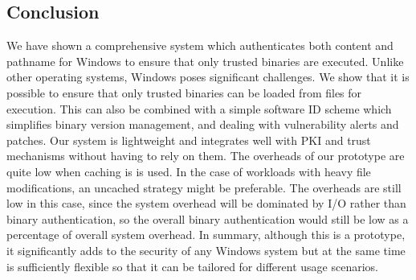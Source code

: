\subsection{Conclusion}
\label{sect:conclusion}

We have shown a comprehensive system which authenticates both content and pathname
for Windows to ensure that only trusted binaries are executed. 
Unlike other operating systems, Windows poses significant challenges.
We show that it is possible to ensure that only trusted binaries can be loaded
from files for execution. 
This can also be combined with a simple software ID
scheme which simplifies binary version management, and dealing
with vulnerability alerts and patches.
Our system is lightweight and integrates well with PKI and 
trust mechanisms without
having to rely on them.
The overheads of our prototype are quite low when caching is is used.
In the case of workloads with heavy file modifications, an uncached strategy might be preferable.
The overheads are still low in this case, since the system overhead
will be dominated by I/O rather than binary authentication, so the overall binary authentication
would still be low as a percentage of overall system overhead. 
In summary, although this is a prototype, it significantly adds
to the security of any Windows system but at the same time is sufficiently
flexible so that it can be tailored for different usage scenarios.

